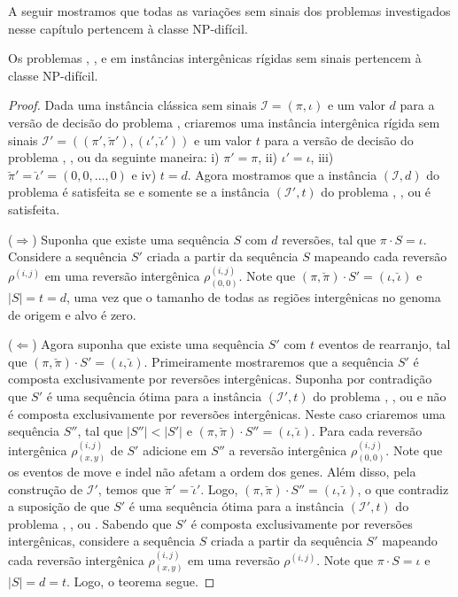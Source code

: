 A seguir mostramos que todas as variações sem sinais dos problemas investigados nesse capítulo pertencem à classe NP-difícil.

\begin{theorem}\label{theorem:YARJETHG}
Os problemas \SbIR{}, \SbIRI{}, \SbIRM{} e \SbIRMI{} em instâncias intergênicas rígidas sem sinais pertencem à classe NP-difícil.
\end{theorem}
\begin{proof}
Dada uma instância clássica sem sinais $\mathcal{I}=(\pi,\iota)$ e um valor $d$ para a versão de decisão do problema \SbR, criaremos uma instância intergênica rígida sem sinais $\mathcal{I'}=((\pi',\breve\pi'),(\iota',\breve\iota'))$ e um valor $t$ para a versão de decisão do problema \SbIR{}, \SbIRI{}, \SbIRM{} ou \SbIRMI{} da seguinte maneira: i) $\pi' = \pi$, ii) $\iota' = \iota$, iii) $\breve\pi' = \breve\iota' = (0,0,\dots,0)$ e iv) $t = d$. Agora mostramos que a instância $(\mathcal{I},d)$ do problema \SbR{} é satisfeita se e somente se a instância $(\mathcal{I'},t)$ do problema \SbIR{}, \SbIRI{}, \SbIRM{} ou \SbIRMI{} é satisfeita.

($\Rightarrow$) Suponha que existe uma sequência $S$ com $d$ reversões, tal que $\pi \cdot S = \iota$. Considere a sequência $S'$ criada a partir da sequência $S$ mapeando cada reversão $\rho^{(i,j)}$ em uma reversão intergênica $\rho^{(i,j)}_{(0,0)}$. Note que $(\pi,\breve\pi) \cdot S' = (\iota,\breve\iota)$ e $|S| = t = d$, uma vez que o tamanho de todas as regiões intergênicas no genoma de origem e alvo é zero.

($\Leftarrow$) Agora suponha que existe uma sequência $S'$ com $t$ eventos de rearranjo, tal que $(\pi,\breve\pi) \cdot S' = (\iota,\breve\iota)$. Primeiramente mostraremos que a sequência $S'$ é composta exclusivamente por reversões intergênicas. Suponha por contradição que $S'$ é uma sequência ótima para a instância $(\mathcal{I'},t)$ do problema \SbIR{}, \SbIRI{}, \SbIRM{} ou \SbIRMI{} e não é composta exclusivamente por reversões intergênicas. Neste caso criaremos uma sequência $S''$, tal que  $|S''| < |S'|$ e $(\pi,\breve\pi) \cdot S'' = (\iota,\breve\iota)$. Para cada reversão intergênica $\rho^{(i,j)}_{(x,y)}$ de $S'$ adicione em $S''$ a reversão intergênica $\rho^{(i,j)}_{(0,0)}$. Note que os eventos de move e indel não afetam a ordem dos genes. Além disso, pela construção de $\mathcal{I'}$, temos que $\breve\pi' = \breve\iota'$. Logo, $(\pi,\breve\pi) \cdot S'' = (\iota,\breve\iota)$, o que contradiz a suposição de que $S'$ é uma sequência ótima para a instância $(\mathcal{I'},t)$ do problema \SbIR{}, \SbIRI{}, \SbIRM{} ou \SbIRMI{}. Sabendo que $S'$ é composta exclusivamente por reversões intergênicas, considere a sequência $S$ criada a partir da sequência $S'$ mapeando cada reversão intergênica $\rho^{(i,j)}_{(x,y)}$ em uma reversão $\rho^{(i,j)}$. Note que $\pi \cdot S = \iota$ e $|S| = d = t$. Logo, o teorema segue.
\end{proof}

